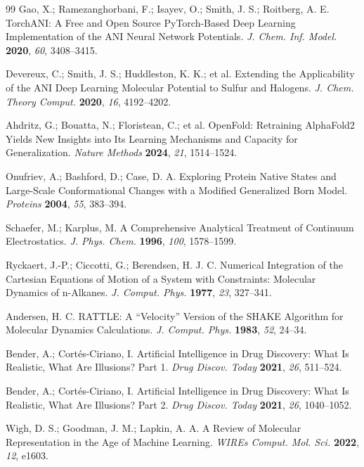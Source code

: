 \documentclass[11pt]{article}
\begin{document}
\begin{thebibliography}{99}
Gao, X.; Ramezanghorbani, F.; Isayev, O.; Smith, J. S.; Roitberg, A. E.
TorchANI: A Free and Open Source PyTorch-Based Deep Learning Implementation of the ANI Neural Network Potentials.
\emph{J. Chem. Inf. Model.} \textbf{2020}, \emph{60}, 3408--3415.

Devereux, C.; Smith, J. S.; Huddleston, K. K.; et al.
Extending the Applicability of the ANI Deep Learning Molecular Potential to Sulfur and Halogens.
\emph{J. Chem. Theory Comput.} \textbf{2020}, \emph{16}, 4192--4202.

Ahdritz, G.; Bouatta, N.; Floristean, C.; et al.
OpenFold: Retraining AlphaFold2 Yields New Insights into Its Learning Mechanisms and Capacity for Generalization.
\emph{Nature Methods} \textbf{2024}, \emph{21}, 1514--1524.

Onufriev, A.; Bashford, D.; Case, D. A.
Exploring Protein Native States and Large-Scale Conformational Changes with a Modified Generalized Born Model.
\emph{Proteins} \textbf{2004}, \emph{55}, 383--394.

Schaefer, M.; Karplus, M.
A Comprehensive Analytical Treatment of Continuum Electrostatics.
\emph{J. Phys. Chem.} \textbf{1996}, \emph{100}, 1578--1599.

Ryckaert, J.-P.; Ciccotti, G.; Berendsen, H. J. C.
Numerical Integration of the Cartesian Equations of Motion of a System with Constraints: Molecular Dynamics of n-Alkanes.
\emph{J. Comput. Phys.} \textbf{1977}, \emph{23}, 327--341.

Andersen, H. C.
RATTLE: A ``Velocity'' Version of the SHAKE Algorithm for Molecular Dynamics Calculations.
\emph{J. Comput. Phys.} \textbf{1983}, \emph{52}, 24--34.

Bender, A.; Cort{\'e}s-Ciriano, I.
Artificial Intelligence in Drug Discovery: What Is Realistic, What Are Illusions? Part 1.
\emph{Drug Discov. Today} \textbf{2021}, \emph{26}, 511--524.

Bender, A.; Cort{\'e}s-Ciriano, I.
Artificial Intelligence in Drug Discovery: What Is Realistic, What Are Illusions? Part 2.
\emph{Drug Discov. Today} \textbf{2021}, \emph{26}, 1040--1052.

Wigh, D. S.; Goodman, J. M.; Lapkin, A. A.
A Review of Molecular Representation in the Age of Machine Learning.
\emph{WIREs Comput. Mol. Sci.} \textbf{2022}, \emph{12}, e1603.


\end{thebibliography}
\end{document}
